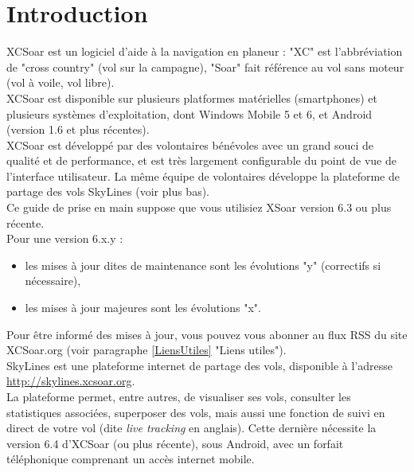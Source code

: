 \documentclass{article}
\begin{document}
\section{Introduction}
\noindent
XCSoar est un logiciel d'aide à la navigation en planeur : "XC" est l'abbréviation de "cross country" (vol sur la campagne), "Soar" fait référence au vol sans moteur (vol à voile, vol libre).\\
%
\newline
%
XCSoar est disponible sur plusieurs platformes matérielles (smartphones) et plusieurs systèmes d'exploitation, dont Windows Mobile 5 et 6, et Android (version 1.6 et plus récentes).\\
%
\newline
%
XCSoar est développé par des volontaires bénévoles avec un grand souci de qualité et de performance, et est très largement configurable du point de vue de l'interface utilisateur. La même équipe de volontaires développe la plateforme de partage des vols SkyLines (voir plus bas).\\
Ce guide de prise en main suppose que vous utilisiez XSoar version 6.3 ou plus récente.\\
Pour une version 6.x.y :
\begin{itemize}
\item les mises à jour dites de maintenance sont les évolutions "y" (correctifs si nécessaire),
\item les mises à jour majeures sont les évolutions "x".
\end{itemize}
%
Pour être informé des mises à jour, vous pouvez vous abonner au flux RSS du site XCSoar.org (voir paragraphe \ref{LiensUtiles} "Liens utiles").\\
%
\newline
SkyLines est une plateforme internet de partage des vols, disponible à l'adresse \url{http://skylines.xcsoar.org}.\\
La plateforme permet, entre autres, de visualiser ses vols, consulter les statistiques associées, superposer des vols, mais aussi une fonction de suivi en direct de votre vol (dite \textit{live tracking} en anglais). Cette dernière nécessite la version 6.4 d'XCSoar (ou plus récente), sous Android, avec un forfait téléphonique comprenant un accès internet mobile.\\
%
\end{document}
